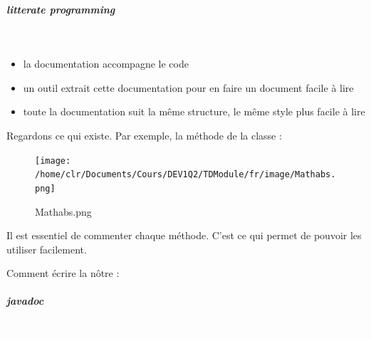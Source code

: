 \documentclass[11pt,a4paper]{article}
\begin{document}
            \par
        
			
		\subparagraph{litterate programming} 
		
					\textcolor{white}{.} \par
				
					\begin{itemize}
				
			\item la documentation accompagne le code
			\item un outil extrait cette documentation pour en faire un document facile \`a lire
			\item toute la documentation suit la m\^eme structure, le m\^eme style \rightarrow plus facile \`a lire
					\end{itemize}
				
            \par
        
		    Regardons ce qui existe. 
		    Par exemple, la m\'ethode \verb@abs@ de la classe \verb@Math@ :
		  
            \par
        \begin{figure}[hbt]
				    \begin{center}
					\texttt{[image: /home/clr/Documents/Cours/DEV1Q2/TDModule/fr/image/Mathabs.png]}
						\end{center}
                
                    \caption[Mathabs.png]{Mathabs.png}
                \end{figure}
                    
            \par
        
		    Il est essentiel de commenter chaque m\'ethode. C'est ce qui permet de pouvoir les utiliser facilement.
		  
            \par
        
		    Comment \'ecrire la n\^otre :
		  
            \par
        
			
		\subparagraph{javadoc} 
		
					\textcolor{white}{.} \par
				
\end{document}
